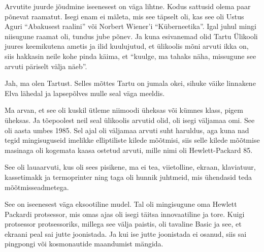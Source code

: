 

Arvutite juurde jõudmine iseenesest on väga lihtne. Kodus sattusid olema paar põnevat raamatut. Isegi enam ei mäleta, mis see täpselt oli, kas see oli Ustus Aguri \enquote{Abakusest raalini} või Norbert Wiener'i \enquote{Küberneetika}. Igal juhul mingi niisugune raamat oli, tundus jube põnev. Ja  kuna esivanemad olid Tartu Ülikooli juures keemikutena ametis ja ilid kuulujutud, et ülikoolis mõni arvuti ikka on, siis hakkasin neile kohe pinda käima, et \enquote{kuulge, ma tahaks näha, missugune see arvuti päriselt välja näeb}.


Jah, ma olen Tartust. Selles mõttes Tartu on jumala okei, sihuke  väike linnakene Elva lähedal ja lapsepõlves mulle seal väga meeldis. 


Ma arvan, et see oli kuskil ütleme niimoodi üheksas või kümnes klass, pigem üheksas. Ja tõepoolest neil seal ülikoolis arvutid olid, oli isegi väljamaa omi. See oli aasta umbes 1985. Sel ajal oli  väljamaa arvuti  suht  haruldus, aga kuna nad tegid mingisuguseid imelikke elliptiliste kilede mõõtmisi, siis selle kilede mõõtmise masinaga oli kogemata kaasa ostetud  arvuti, mille nimi oli Hewlett-Packard 85. 


See oli lauaarvuti, kus oli sees pisikene, ma ei tea, viietolline, ekraan, klaviatuur, kassetimakk ja termoprinter ning taga oli hunnik juhtmeid, mis ühendasid teda mõõtmisseadmetega.


See on iseenesest väga eksootiline mudel. Tal oli mingisugune oma Hewlett Packardi protsessor, mis  omas ajas oli isegi täitsa innovaatiline ja tore. Kuigi protsessor protsessoriks, millega see välja paistis, oli tavaline Basic ja see, et ekraani peal sai jutte joonistada. Ja kui ise jutte joonistada ei osanud, siis sai pingpongi või kosmonautide maandumist mängida. 

